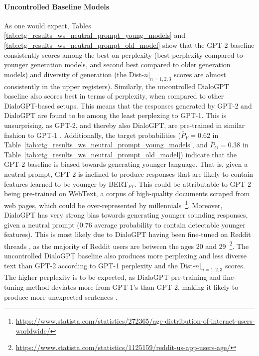 \paragraph{Uncontrolled Baseline Models} As one would expect, Tables \ref{tab:ctg_results_ws_neutral_prompt_young_models} and \ref{tab:ctg_results_ws_neutral_prompt_old_model} show that the GPT-2 baseline consistently scores among the best on perplexity (best perplexity compared to younger generation models, and second best compared to older generation models) and diversity of generation (the Dist-$n |_{n = 1,2,3}$ scores are almost consistently in the upper registers). Similarly, the uncontrolled DialoGPT baseline also scores best in terms of perplexity, when compared to other DialoGPT-based setups. This means that the responses generated by GPT-2 and DialoGPT are found to be among the least perplexing to GPT-1. This is unsurprising, as GPT-2, and thereby also DialoGPT, are pre-trained in similar fashion to GPT-1 \citep{radford2018improving, radford2019language, zhang2019dialogpt}. Additionally, the target probabilities ($\bar{P}_Y = 0.62$ in Table~\ref{tab:ctg_results_ws_neutral_prompt_young_models}, and $\bar{P}_O = 0.38$ in Table~\ref{tab:ctg_results_ws_neutral_prompt_old_model}) indicate that the GPT-2 baseline is biased towards generating younger language. That is, given a neutral prompt, GPT-2 is inclined to produce responses that are likely to contain features learned to be younger by BERT$_{FT}$. This could be attributable to GPT-2 being pre-trained on WebText, a corpus of high-quality documents scraped from web pages, which could be over-represented by millennials~\footnote{\url{https://www.statista.com/statistics/272365/age-distribution-of-internet-users-worldwide/}}. Moreover, DialoGPT has very strong bias towards generating younger sounding responses, given a neutral prompt (0.76 average probability to contain detectable younger features). This is most likely due to DialoGPT having been fine-tuned on Reddit threads \citep{zhang2019dialogpt}, as the majority of Reddit users are between the ages 20 and 29~\footnote{\url{https://www.statista.com/statistics/1125159/reddit-us-app-users-age/}}.
The uncontrolled DialoGPT baseline also produces more perplexing and less diverse text than GPT-2 according to GPT-1 perplexity and the Dist-$n |_{n = 1,2,3}$ scores. The higher perplexity is to be expected, as DialoGPT pre-training and fine-tuning method deviates more from GPT-1's than GPT-2, making it likely to produce more unexpected sentences \citep{zhang2019dialogpt}.


